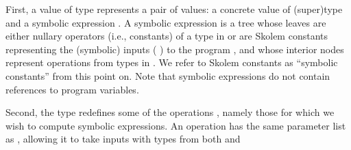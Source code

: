 \documentclass{IOS-Book-Article}
\begin{document}
\begin{mdUl}[class={list-star,loose},data-line={365}]%
\begin{mdLi}[data-line={365}]%
\begin{mdP}[data-line={365}]%
{}First, a value of type %
{}%
{} represents a pair of values: 
a concrete value %
{}%
{} of (super)type %
{}%
{} and a symbolic expression %
{}%
{}. 
A symbolic expression is a tree
whose leaves are either nullary operators (i.e., constants) of a type in %
{}%
{}
or are Skolem constants representing the (symbolic) inputs (%
{}%
{})
to the program %
{}%
{}, and whose interior nodes represent operations 
from types in %
{}%
{}. We refer to Skolem constants as %
{}{\textquotedblleft}symbolic constants{\textquotedblright}%
{}
from this point on. Note that symbolic expressions do not contain
references to program variables.%
\end{mdP}%
\end{mdLi}%
\begin{mdLi}[data-line={375}]%
\begin{mdP}[data-line={375}]%
{}Second, the type %
{}%
{} redefines some of the operations %
{}%
{},
namely those for which we wish to compute symbolic expressions.
An operation %
{}%
{} has the same parameter list as %
{}%
{}, allowing it
to take inputs with types from both %
{}%
{} and %
{}%

\end{mdP}
\end{mdLi}
\end{mdUl}
\end{document}
